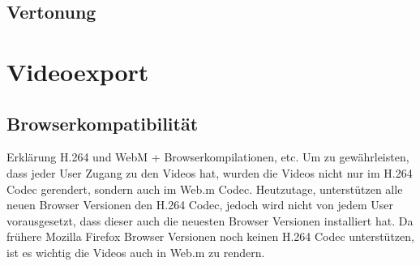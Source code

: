 \subsection{Vertonung}

\section{Videoexport}
\subsection{Browserkompatibilität}
\renewcommand{\kapitelautor}{Autor: Kerstin Schön}
Erklärung H.264 und WebM + Browserkompilationen, etc.
Um zu gewährleisten, dass jeder User Zugang zu den Videos hat, wurden die Videos nicht nur im H.264 Codec gerendert, sondern auch im Web.m Codec. Heutzutage, unterstützen alle neuen Browser Versionen den H.264 Codec, jedoch wird nicht von jedem User vorausgesetzt, dass dieser auch die neuesten Browser Versionen installiert hat. Da frühere Mozilla Firefox Browser Versionen noch keinen H.264 Codec unterstützen, ist es wichtig die Videos auch in Web.m zu rendern. 